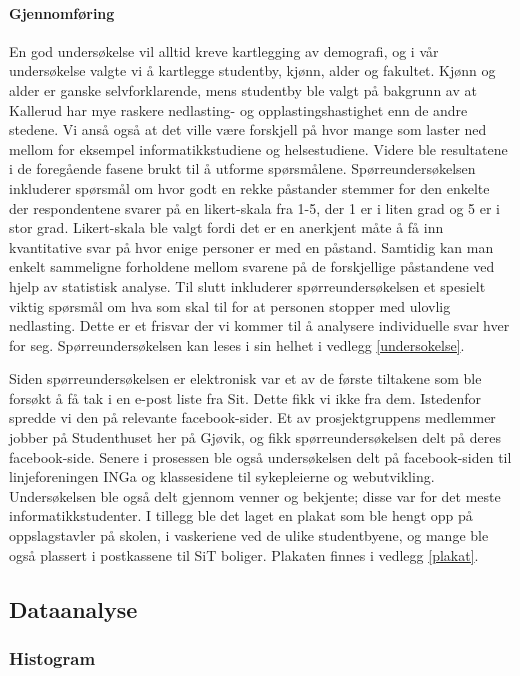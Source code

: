 \paragraph{Gjennomføring}
En god undersøkelse vil alltid kreve kartlegging av demografi, og i vår undersøkelse valgte vi å kartlegge studentby, kjønn, alder og fakultet. Kjønn og alder er ganske selvforklarende, mens studentby ble valgt på bakgrunn av at Kallerud har mye raskere nedlasting- og opplastingshastighet enn de andre stedene. Vi anså også at det ville være forskjell på hvor mange som laster ned mellom for eksempel informatikkstudiene og helsestudiene. Videre ble resultatene i de foregående fasene brukt til å utforme spørsmålene. Spørreundersøkelsen inkluderer spørsmål om hvor godt en rekke påstander stemmer for den enkelte der respondentene svarer på en likert-skala fra 1-5, der 1 er i liten grad og 5 er i stor grad. Likert-skala ble valgt fordi det er en anerkjent måte å få inn kvantitative svar på hvor enige personer er med en påstand. Samtidig kan man enkelt sammeligne forholdene mellom svarene på de forskjellige påstandene ved hjelp av statistisk analyse. Til slutt inkluderer spørreundersøkelsen et spesielt viktig spørsmål om hva som skal til for at personen stopper med ulovlig nedlasting. Dette er et frisvar der vi kommer til å analysere individuelle svar hver for seg. Spørreundersøkelsen kan leses i sin helhet i vedlegg \ref{undersokelse}.
\newline

Siden spørreundersøkelsen er elektronisk var et av de første tiltakene som ble forsøkt å få tak i en e-post liste fra Sit. Dette fikk vi ikke fra dem. Istedenfor spredde vi den på relevante facebook-sider. Et av prosjektgruppens medlemmer jobber på Studenthuset her på Gjøvik, og fikk spørreundersøkelsen delt på deres facebook-side. Senere i prosessen ble også undersøkelsen delt på facebook-siden til linjeforeningen INGa og klassesidene til sykepleierne og webutvikling. Undersøkelsen ble også delt gjennom venner og bekjente; disse var for det meste informatikkstudenter. I tillegg ble det laget en plakat som ble hengt opp på oppslagstavler på skolen, i vaskeriene ved de ulike studentbyene, og mange ble også plassert i postkassene til SiT boliger. Plakaten finnes i vedlegg \ref{plakat}.


\subsection{Dataanalyse}

\subsubsection{Histogram}

